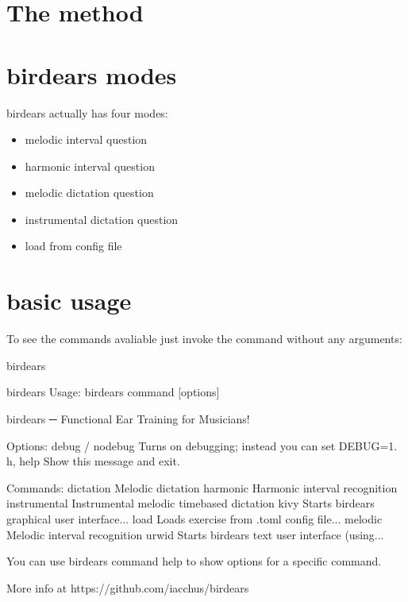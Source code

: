 \documentclass[letterpaper,10pt,english]{sphinxmanual}
\begin{document}
\section{The method}
\label{\detokenize{using:the-method}}

\section{birdears modes}
\label{\detokenize{using:birdears-modes}}
birdears actually has four modes:
\begin{itemize}
\item {} 
melodic interval question

\item {} 
harmonic interval question

\item {} 
melodic dictation question

\item {} 
instrumental dictation question

\item {} 
load from config file

\end{itemize}


\section{basic usage}
\label{\detokenize{using:basic-usage}}
To see the commands avaliable just invoke the command without any arguments:

\begin{sphinxVerbatim}[commandchars=\\\{\}]
birdears
\end{sphinxVerbatim}

\begin{sphinxVerbatim}[commandchars=\\\{\}]
\PYGZdl{} birdears
Usage: birdears  \PYGZlt{}command\PYGZgt{} [options]

birdears ─ Functional Ear Training for Musicians!

Options:
  \PYGZhy{}\PYGZhy{}debug / \PYGZhy{}\PYGZhy{}no\PYGZhy{}debug  Turns on debugging; instead you can set DEBUG=1.
  \PYGZhy{}h, \PYGZhy{}\PYGZhy{}help            Show this message and exit.

Commands:
  dictation     Melodic dictation
  harmonic      Harmonic interval recognition
  instrumental  Instrumental melodic time\PYGZhy{}based dictation
  kivy          Starts birdears graphical user interface...
  load          Loads exercise from .toml config file...
  melodic       Melodic interval recognition
  urwid         Starts birdears text user interface (using...

  You can use \PYGZsq{}birdears \PYGZlt{}command\PYGZgt{} \PYGZhy{}\PYGZhy{}help\PYGZsq{} to show options for a specific
  command.

  More info at https://github.com/iacchus/birdears
\end{sphinxVerbatim}
\end{document}
